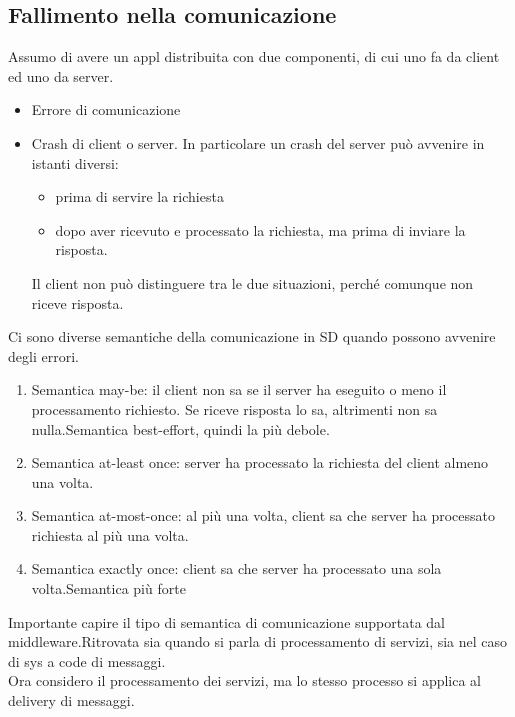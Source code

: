 \documentclass[16px]{article}
\begin{document}
\subsection{Fallimento nella comunicazione}
Assumo di avere un appl distribuita con due componenti, di cui uno fa da client ed uno da server.\\
\begin{itemize}
\item Errore di comunicazione
\item Crash di client o server. In particolare un crash del server può avvenire in istanti diversi:
\begin{itemize}
\item prima di servire la richiesta
\item dopo aver ricevuto e processato la richiesta, ma prima di inviare la risposta.
\end{itemize}
Il client non può distinguere tra le due situazioni, perché comunque non riceve risposta.
\end{itemize}
Ci sono diverse semantiche della comunicazione in SD quando possono avvenire degli errori.
\begin{enumerate}
\item Semantica may-be: il client non sa se il server ha eseguito o meno il processamento richiesto. Se riceve risposta lo sa, altrimenti non sa nulla.Semantica best-effort, quindi la più debole.
\item Semantica at-least once: server ha processato la richiesta del client almeno una volta.
\item Semantica at-most-once: al più una volta, client sa che server ha processato richiesta al più una volta.
\item Semantica exactly once: client sa che server ha processato una sola volta.Semantica più forte
\end{enumerate}
Importante capire il tipo di semantica di comunicazione supportata dal middleware.Ritrovata sia quando si parla di processamento di servizi, sia nel caso di sys a code di messaggi.\\
Ora considero il processamento dei servizi, ma lo stesso processo si applica al delivery di messaggi.
\end{document}
